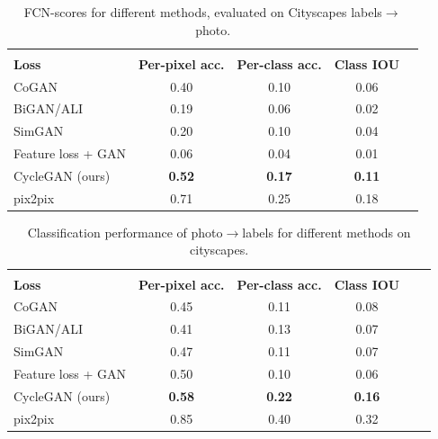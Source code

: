 \begin{table}
\centering
\vspace{-2mm}
\scalebox{0.75} {
\begin{tabular}{lcccc}
 & & & \\
\textbf{Loss} & \textbf{Per-pixel acc.} & \textbf{Per-class acc.} & \textbf{Class IOU} \\ \hline
CoGAN~\cite{liu2016coupled} & 0.40 & 0.10 & 0.06 \\
BiGAN/ALI~\cite{dumoulin2016adversarially,donahue2016adversarial} & 0.19 & 0.06 & 0.02 \\
SimGAN~\cite{shrivastava2016learning} & 0.20 & 0.10 & 0.04 \\
Feature loss + GAN & 0.06 & 0.04 & 0.01 \\
CycleGAN (ours) & {\bf 0.52} & {\bf 0.17} & {\bf 0.11} \\ \hline
pix2pix~\cite{isola2016image} & 0.71 & 0.25 & 0.18 \\ 
\end{tabular} }
\vspace{-0.1in}
\caption {FCN-scores for different methods, evaluated on Cityscapes labels$\rightarrow$photo.}
\vspace{-0.2in}
\end{table}


\begin{table}
\centering
\scalebox{0.75} {
\begin{tabular}{lccccc}
 & & & \\
\textbf{Loss} & \textbf{Per-pixel acc.} & \textbf{Per-class acc.} & \textbf{Class IOU} \\ \hline
CoGAN~\cite{liu2016coupled} & 0.45 & 0.11 & 0.08\\
BiGAN/ALI~\cite{dumoulin2016adversarially,donahue2016adversarial} & 0.41 & 0.13 & 0.07 \\
SimGAN~\cite{shrivastava2016learning} & 0.47 & 0.11 & 0.07\\
Feature loss + GAN & 0.50  & 0.10 & 0.06 \\
CycleGAN (ours) & {\bf 0.58} & {\bf 0.22} & {\bf 0.16}\\\hline
pix2pix~\cite{isola2016image} & 0.85 & 0.40 & 0.32 \\
\end{tabular} }
\vspace{-0.1in}
\caption {Classification performance of photo$\rightarrow$labels for different methods on cityscapes.}
\vspace{-0.1in}
\end{table}


